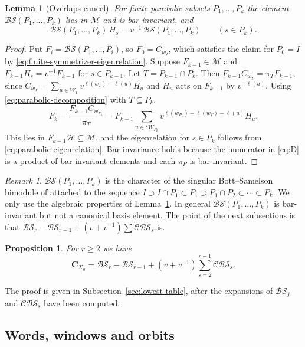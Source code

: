 \documentclass[11pt,a4paper,reqno]{amsart}
\numberwithin{equation}{section}
\newtheorem{proposition}[theorem]{Proposition}
\newtheorem{lemma}[theorem]{Lemma}
\theoremstyle{definition}
\theoremstyle{remark}
\newtheorem{remark}[theorem]{Remark}
\theoremstyle{plain}
\newcommand{\C}{\mathbf C}
\newcommand{\M}{\mathcal M}
\newcommand{\D}{\mathcal {BS}}
\newcommand{\R}{\mathcal {BS}}
\newcommand{\V}{\mathcal {CBS}}
\begin{document}
\begin{lemma}[Overlaps cancel]\label{lem:overlaps}
For finite parabolic subsets $P_1,\ldots,P_k$ the element $\D(P_1,\ldots,P_k)$ lies in $\M$ and is bar-invariant, and
\[
 \D(P_1,\ldots,P_k)\,H_s=v^{-1}\,\D(P_1,\ldots,P_k)\qquad(s\in P_k).
\]
\end{lemma}

  \begin{proof}
Put $F_i=\D(P_1,\ldots,P_i)$, so $F_0=C_{w_I}$, which satisfies the claim for $P_0=I$ by
\eqref{eq:finite-symmetrizer-eigenrelation}. Suppose $F_{k-1}\in\M$ and $F_{k-1}H_s=v^{-1}F_{k-1}$ for
$s\in P_{k-1}$. Let $T=P_{k-1}\cap P_k$. Then
$F_{k-1}C_{w_T}=\pi_TF_{k-1}$, since $C_{w_T}=\sum_{u\in W_T}v^{\ell(w_T)-\ell(u)}H_u$ and $H_u$ acts on $F_{k-1}$ by $v^{-\ell(u)}$.
Using \eqref{eq:parabolic-decomposition} with $T\subseteq P_k$,
\[
 F_k=\frac{F_{k-1}C_{w_{P_k}}}{\pi_T}
 =F_{k-1}\sum_{u\in{}^TW_{P_k}}v^{\ell(w_{P_k})-\ell(w_T)-\ell(u)}H_u .
\]
This lies in $F_{k-1}\mathcal H\subseteq\M$, and the eigenrelation for $s\in P_k$ follows from
\eqref{eq:parabolic-eigenrelation}. Bar-invariance holds because the numerator in \eqref{eq:D}
is a product of bar-invariant elements and each $\pi_P$ is bar-invariant.
\end{proof}



\begin{remark}
$\D(P_1,\ldots,P_k)$ is the character of the singular Bott--Samelson bimodule of
 \cite{Williamson-singular} attached to the sequence
$I\supset I\cap P_1\subset P_1\supset P_1\cap P_2\subset\cdots\subset P_k$. We only use the algebraic
properties of Lemma~\ref{lem:overlaps}. In general $\D(P_1,\ldots,P_k)$ is bar-invariant but not a canonical
basis element. The point of the next subsections is that $\R_r-\R_{r-1}+(v+v^{-1})\sum\V_s$ is.
\end{remark}

\begin{proposition}\label{prop:canonical-lift}
For $r\geq2$ we have
\[
 \C_{X_0}=\R_r-\R_{r-1}+(v+v^{-1})\sum_{s=2}^{r-1}\V_s .
\]
\end{proposition}
The proof is given in Subsection~\ref{sec:lowest-table}, after the expansions of $\R_j$ and $\V_s$ have been
computed.

\subsection{Words, windows and orbits}\label{sec:words}
\end{document}
